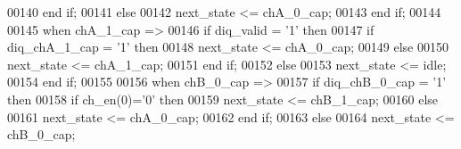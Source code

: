\begin{DoxyCode}
00140             \textcolor{keywordflow}{end} \textcolor{keywordflow}{if};
00141          \textcolor{keywordflow}{else} 
00142             \textcolor{vhdlchar}{next_state} \textcolor{vhdlchar}{<=} \textcolor{vhdlchar}{chA\_0\_cap};
00143          \textcolor{keywordflow}{end} \textcolor{keywordflow}{if};
00144          
00145       \textcolor{keywordflow}{when} \textcolor{vhdlchar}{chA\_1\_cap} \textcolor{vhdlchar}{=}\textcolor{vhdlchar}{>}
00146          \textcolor{keywordflow}{if} \textcolor{vhdlchar}{diq_valid} \textcolor{vhdlchar}{=} \textcolor{vhdlchar}{'}\textcolor{vhdllogic}{}\textcolor{vhdllogic}{1}\textcolor{vhdlchar}{'} \textcolor{keywordflow}{then}
00147             \textcolor{keywordflow}{if} \textcolor{vhdlchar}{diq_chA_1_cap} \textcolor{vhdlchar}{=} \textcolor{vhdlchar}{'}\textcolor{vhdllogic}{}\textcolor{vhdllogic}{1}\textcolor{vhdlchar}{'} \textcolor{keywordflow}{then}
00148                \textcolor{vhdlchar}{next_state} \textcolor{vhdlchar}{<=} \textcolor{vhdlchar}{chA\_0\_cap};
00149             \textcolor{keywordflow}{else} 
00150                \textcolor{vhdlchar}{next_state} \textcolor{vhdlchar}{<=} \textcolor{vhdlchar}{chA\_1\_cap};
00151             \textcolor{keywordflow}{end} \textcolor{keywordflow}{if};
00152          \textcolor{keywordflow}{else}
00153             \textcolor{vhdlchar}{next_state} \textcolor{vhdlchar}{<=} \textcolor{vhdlchar}{idle};
00154          \textcolor{keywordflow}{end} \textcolor{keywordflow}{if};
00155          
00156       \textcolor{keywordflow}{when} \textcolor{vhdlchar}{chB\_0\_cap} \textcolor{vhdlchar}{=}\textcolor{vhdlchar}{>} 
00157          \textcolor{keywordflow}{if} \textcolor{vhdlchar}{diq_chB_0_cap} \textcolor{vhdlchar}{=} \textcolor{vhdlchar}{'}\textcolor{vhdllogic}{}\textcolor{vhdllogic}{1}\textcolor{vhdlchar}{'} \textcolor{keywordflow}{then}
00158             \textcolor{keywordflow}{if} \textcolor{vhdlchar}{ch_en}\textcolor{vhdlchar}{(}\textcolor{vhdllogic}{}\textcolor{vhdllogic}{0}\textcolor{vhdlchar}{)}\textcolor{vhdlchar}{=}\textcolor{vhdlchar}{'}\textcolor{vhdllogic}{}\textcolor{vhdllogic}{0}\textcolor{vhdlchar}{'} \textcolor{keywordflow}{then}
00159                \textcolor{vhdlchar}{next_state} \textcolor{vhdlchar}{<=} \textcolor{vhdlchar}{chB\_1\_cap};
00160             \textcolor{keywordflow}{else} 
00161                \textcolor{vhdlchar}{next_state} \textcolor{vhdlchar}{<=} \textcolor{vhdlchar}{chA\_0\_cap};
00162             \textcolor{keywordflow}{end} \textcolor{keywordflow}{if};
00163          \textcolor{keywordflow}{else} 
00164             \textcolor{vhdlchar}{next_state} \textcolor{vhdlchar}{<=} \textcolor{vhdlchar}{chB\_0\_cap};

\end{DoxyCode}
